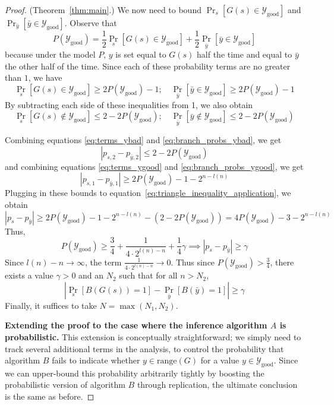 \documentclass{article}
\def \Ygood{\mathcal{Y}_\text{good}}
\def \by{{\bar{y}}}
\theoremstyle{definition}
\theoremstyle{remark}
\begin{document}
\begin{proof}{(Theorem~\ref{thm:main}.)}
We now need to bound $\Pr_s[G(s) \in \Ygood]$ and $\Pr_\by[\by \in \Ygood]$.
Observe that
$$
P(\Ygood) = \frac{1}{2}\Pr_s[G(s) \in \Ygood] + \frac{1}{2}\Pr_\by[\by \in \Ygood]
$$
because under the model $P$, $y$ is set equal to $G(s)$ half the time and equal to $\by$ the other half of the time.
Since each of these probability terms are no greater than $1$, we have
\begin{equation} \label{eq:branch_probs_ygood}
\Pr_s[G(s) \in \Ygood] \geq 2P(\Ygood) - 1;
\quad
\Pr_\by[\by \in \Ygood] \geq 2P(\Ygood) - 1        
\end{equation}
By subtracting each side of these inequalities from 1, we also obtain
\begin{equation} \label{eq:branch_probs_ybad}
\Pr_s[G(s) \notin \Ygood] \leq 2 - 2P(\Ygood);
\quad
\Pr_\by[\by \notin \Ygood] \leq 2 - 2P(\Ygood)
\end{equation}

Combining equations \ref{eq:terms_ybad} and \ref{eq:branch_probs_ybad}, we get
\begin{equation}
|p_{s, 2} - p_{\by, 2}| \leq 2 - 2P(\Ygood)    
\end{equation}
and combining equations \ref{eq:terms_ygood} and \ref{eq:branch_probs_ygood}, we get
\begin{equation} \label{eq:term1s_err_bound}
|p_{s, 1} - p_{\by, 1}| \geq 2P(\Ygood) - 1 - 2^{n - l(n)}    
\end{equation}
Plugging in these bounds to equation~\ref{eq:triangle_inequality_application}, we obtain
\begin{equation} \label{eq:final_ps_py_bound}
|p_s - p_\by| \geq
2P(\Ygood) - 1 - 2^{n - l(n)}
- (2 - 2P(\Ygood))
= 4 P(\Ygood) - 3 - 2^{n - l(n)}
\end{equation}
Thus, 
$$
P(\Ygood) \geq \frac{3}{4} + \frac{1}{4 \cdot 2^{l(n) - n}} + \frac{1}{4}\gamma
\implies |p_s - p_\by| \geq \gamma
$$
Since $l(n) - n \to \infty$, the term $\frac{1}{4 \cdot 2^{l(n) - n}} \to 0$.
Thus since $P(\Ygood) > \frac{3}{4}$, there exists a value $\gamma > 0$ and an $N_2$ such that for all $n > N_2$,
$$
|\Pr_s[B(G(s)) = 1] - \Pr_{\bar{y}}[B(\bar{y}) = 1]| \geq \gamma
$$
Finally, it suffices to take $N = \max(N_1, N_2)$.

\medskip
\noindent
\textbf{Extending the proof to the case where the inference algorithm $A$ is probabilistic.}
This extension is conceptually straightforward; we simply need to track several additional terms in the analysis, to control the probability that algorithm $B$ fails to indicate whether $y \in \text{range}(G)$ for a value $y \in \Ygood$.
Since we can upper-bound this probability arbitrarily tightly by boosting the probabilistic version of algorithm $B$ through replication, the ultimate conclusion is the same as before.


\end{proof}
\end{document}
